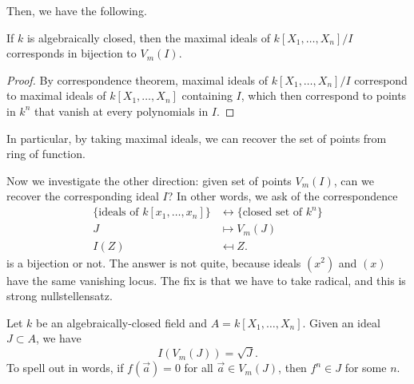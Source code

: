 Then, we have the following.
\begin{proposition}
    If $k$ is algebraically closed,
    then the maximal ideals of $k[X_1,\dots,X_n]/I$
    corresponds in bijection to $V_m(I)$.
\end{proposition}
\begin{proof}
    By correspondence theorem,
    maximal ideals of $k[X_1,\dots,X_n]/I$
    correspond to maximal ideals of $k[X_1,\dots,X_n]$
    containing $I$,
    which then correspond to points in $k^n$
    that vanish at every polynomials in $I$.
\end{proof}
In particular, by taking maximal ideals,
we can recover the set of points from ring of function.

Now we investigate the other direction:
given set of points $V_m(I)$, 
can we recover the corresponding ideal $I$?
In other words, we ask of the correspondence
\begin{align*}
    \{\text{ideals of }k[x_1,\dots,x_n]\} &\leftrightarrow \{\text{closed set of }k^n\} \\
    J &\mapsto V_m(J) \\
    I(Z) &\mapsfrom Z.
\end{align*}
is a bijection or not. The answer is not quite,
because ideals $(x^2)$ and $(x)$ have the same
vanishing locus. The fix is that we have to take radical,
and this is strong nullstellensatz.
\begin{theorem}
    Let $k$ be an algebraically-closed field
    and $A=k[X_1,\dots,X_n]$. Given an ideal $J\subset A$, we have
	$$I(V_m(J)) = \sqrt J.$$
    To spell out in words, if $f(\vec a)=0$ for all
    $\vec a\in V_m(J)$, then $f^n\in J$ for some $n$.
\end{theorem}
